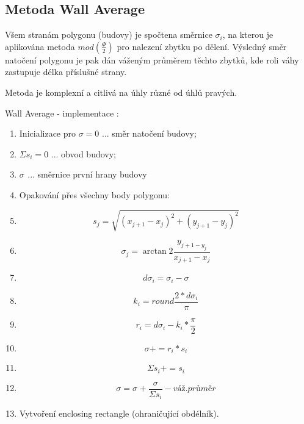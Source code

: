 \documentclass[oneside,12pt,a4paper]{book}
\begin{document}
\bigskip


\subsection{Metoda Wall Average}
Všem stranám polygonu (budovy) je spočtena směrnice $\sigma_i$, na kterou je aplikována metoda $mod(\frac{\Phi}{2})$ pro nalezení zbytku po dělení. Výsledný směr natočení polygonu je pak dán váženým průměrem těchto zbytků, kde roli váhy zastupuje délka příslušné strany.\par
Metoda je komplexní a citlivá na úhly různé od úhlů pravých.\par

\bigskip

Wall Average - implementace $:$

\begin{enumerate}
\item Inicializace pro $\sigma = 0$ ... směr natočení budovy;
\item \quad \quad \quad $\Sigma s_i = 0$ ... obvod budovy;
\item \quad \quad \quad $\sigma_{}$ ... směrnice první hrany budovy 
\item Opakování přes všechny body polygonu:
\item \quad \begin{equation}
    s_j = \sqrt{(x_{j+1}-x_j)^2 + (y_{j+1}-y_j)^2}
\end{equation}
\item \quad \begin{equation}
    \sigma_j = \arctan2 \frac{y_{j+1-y_j}}{x_{j+1}-x_j}
\end{equation}
\item \quad \begin{equation}
    d \sigma_i= \sigma_i-\sigma
\end{equation}
\item \quad \begin{equation}
    k_i=round \frac{2*d \sigma_i}{\pi}
\end{equation}
\item \quad \begin{equation}
    r_i=d \sigma_i - k_i*\frac{\pi}{2}
\end{equation}
\item \quad \begin{equation}
    \sigma+=r_i*s_i
\end{equation}
\item \quad \begin{equation}
    \Sigma s_i+=s_i
\end{equation}
\item \begin{equation}
    \sigma = \sigma_{}+\frac{\sigma}{\Sigma s_i}-\textit{váž.průměr}
\end{equation}
\item Vytvoření enclosing rectangle (ohraničující obdélník).
\end{enumerate}
\end{document}
